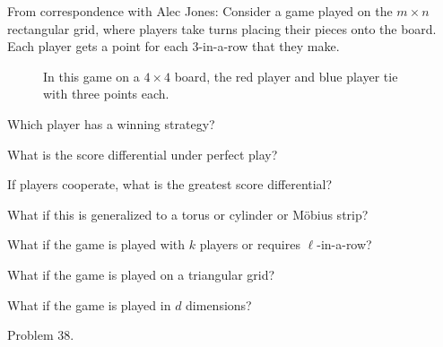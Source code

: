 \documentclass{article}
\begin{document}
From correspondence with Alec Jones: Consider a game played on the
$m \times n$ rectangular grid, where players take turns placing their pieces
onto the board. Each player gets a point for each 3-in-a-row that they make.
\begin{figure}[!h]
  \centering
  \caption{
    In this game on a $4 \times 4$ board, the red player and blue player tie with three points each.
  }
\end{figure}

\begin{question}
  Which player has a winning strategy?
\end{question}
\begin{related}
  \item What is the score differential under perfect play?
  \item If players cooperate, what is the greatest score differential?
  \item What if this is generalized to a torus or cylinder or M\"obius strip?
  \item What if the game is played with $k$ players or requires $\ell$-in-a-row?
  \item What if the game is played on a triangular grid?
  \item What if the game is played in $d$ dimensions?
\end{related}
\begin{references}
  \item Problem 38.
\end{references}
\end{document}
